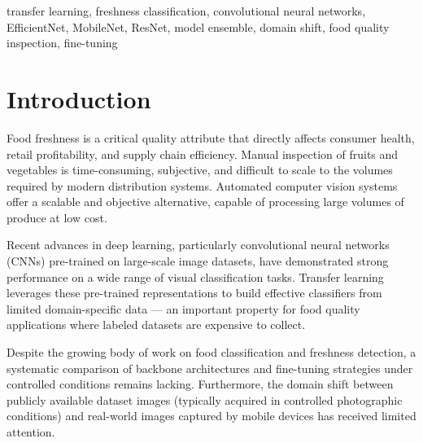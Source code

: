 \documentclass[conference]{IEEEtran}
\begin{document}
\begin{IEEEkeywords}
transfer learning, freshness classification, convolutional neural networks,
EfficientNet, MobileNet, ResNet, model ensemble, domain shift,
food quality inspection, fine-tuning
\end{IEEEkeywords}

\section{Introduction}
\label{sec:intro}

Food freshness is a critical quality attribute that directly affects
consumer health, retail profitability, and supply chain efficiency.
Manual inspection of fruits and vegetables is time-consuming, subjective,
and difficult to scale to the volumes required by modern distribution
systems.
Automated computer vision systems offer a scalable and objective
alternative, capable of processing large volumes of produce at low cost.

Recent advances in deep learning, particularly convolutional neural
networks (CNNs) pre-trained on large-scale image datasets, have
demonstrated strong performance on a wide range of visual classification
tasks.
Transfer learning~\cite{pan2010transfer} leverages these pre-trained
representations to build effective classifiers from limited
domain-specific data --- an important property for food quality
applications where labeled datasets are expensive to collect.

Despite the growing body of work on food classification and freshness
detection, a systematic comparison of backbone architectures and
fine-tuning strategies under controlled conditions remains lacking.
Furthermore, the domain shift between publicly available dataset images
(typically acquired in controlled photographic conditions) and real-world
images captured by mobile devices has received limited attention.
\end{document}
